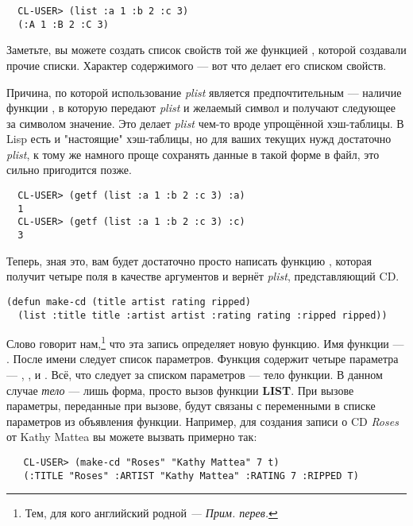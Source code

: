 \begin{verbatim}
  CL-USER> (list :a 1 :b 2 :c 3)
  (:A 1 :B 2 :C 3)
\end{verbatim}

Заметьте, вы можете создать список свойств той же функцией , которой создавали
прочие списки. Характер содержимого --- вот что делает его списком свойств.

Причина, по которой использование \textit{plist} является предпочтительным --- наличие
функции , в которую передают \textit{plist} и желаемый символ и получают
следующее за символом значение. Это делает \textit{plist} чем-то вроде упрощённой
хэш-таблицы. В Lisp есть и "настоящие" хэш-таблицы, но для ваших текущих нужд достаточно
\textit{plist}, к тому же намного проще сохранять данные в такой форме в файл, это сильно
пригодится позже.

\begin{verbatim}
  CL-USER> (getf (list :a 1 :b 2 :c 3) :a)
  1
  CL-USER> (getf (list :a 1 :b 2 :c 3) :c)
  3
\end{verbatim}

Теперь, зная это, вам будет достаточно просто написать функцию , которая
получит четыре поля в качестве аргументов и вернёт \textit{plist}, представляющий CD.

\begin{lstlisting}
(defun make-cd (title artist rating ripped)
  (list :title title :artist artist :rating rating :ripped ripped))
\end{lstlisting}

Слово  говорит нам,\footnote{Тем, для кого английский родной \textit{---
Прим. перев.}} что эта запись определяет новую функцию. Имя функции ---
. После имени следует список параметров. Функция содержит четыре параметра
--- , ,  и . Всё, что следует за
списком параметров --- тело функции. В данном случае \textit{тело} --- лишь форма, просто
вызов функции \textbf{LIST}. При вызове  параметры, переданные при вызове,
будут связаны с переменными в списке параметров из объявления функции. Например, для
создания записи о CD \textit{Roses} от Kathy Mattea вы можете вызвать 
примерно так:

\begin{verbatim}
   CL-USER> (make-cd "Roses" "Kathy Mattea" 7 t)
   (:TITLE "Roses" :ARTIST "Kathy Mattea" :RATING 7 :RIPPED T) 
\end{verbatim}


